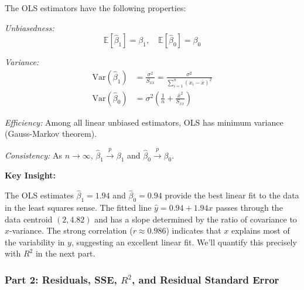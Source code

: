 \documentclass[12pt]{article}
\begin{document}
\begin{explanation}
The OLS estimators have the following properties:

\textit{Unbiasedness:}
\[
\mathbb{E}[\hat{\beta}_1] = \beta_1, \quad \mathbb{E}[\hat{\beta}_0] = \beta_0
\]

\textit{Variance:}
\begin{align*}
\text{Var}(\hat{\beta}_1) &= \frac{\sigma^2}{S_{xx}} = \frac{\sigma^2}{\sum_{i=1}^{n}(x_i - \bar{x})^2} \\
\text{Var}(\hat{\beta}_0) &= \sigma^2\left(\frac{1}{n} + \frac{\bar{x}^2}{S_{xx}}\right)
\end{align*}

\textit{Efficiency:} Among all linear unbiased estimators, OLS has minimum variance (Gauss-Markov theorem).

\textit{Consistency:} As $n \to \infty$, $\hat{\beta}_1 \xrightarrow{p} \beta_1$ and $\hat{\beta}_0 \xrightarrow{p} \beta_0$.

\textbf{Key Insight:}

The OLS estimates $\hat{\beta}_1 = 1.94$ and $\hat{\beta}_0 = 0.94$ provide the best linear fit to the data in the least squares sense. The fitted line $\hat{y} = 0.94 + 1.94x$ passes through the data centroid $(2, 4.82)$ and has a slope determined by the ratio of covariance to $x$-variance. The strong correlation ($r \approx 0.986$) indicates that $x$ explains most of the variability in $y$, suggesting an excellent linear fit. We'll quantify this precisely with $R^2$ in the next part.
\end{explanation}

\subsubsection{Part 2: Residuals, SSE, $R^2$, and Residual Standard Error}
\end{document}

